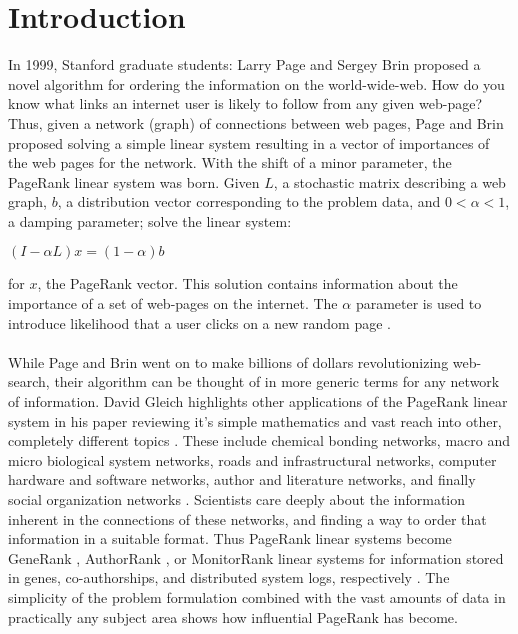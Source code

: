 \documentclass{article}
\begin{document}
\section{Introduction}
In 1999, Stanford graduate students: Larry Page and Sergey Brin proposed a novel algorithm for ordering the information on the world-wide-web. How do you know what links an internet user is likely to follow from any given web-page? Thus, given a network (graph) of connections between web pages, Page and Brin proposed solving a simple linear system resulting in a vector of importances of the web pages for the network. With the shift of a minor parameter, the PageRank linear system was born. Given \textbf{$L$}, a stochastic matrix describing a web graph, \textbf{$b$}, a distribution vector corresponding to the problem data, and $0 < \alpha < 1$, a damping parameter; solve the linear system:\\
\begin{center}
$(I-\alpha L)x = (1-\alpha)b$ \cite{Page:1999} \\
\end{center}
for \textbf{$x$}, the PageRank vector. This solution contains information about the importance of a set of web-pages on the internet. The $\alpha$ parameter is used to introduce likelihood that a user clicks on a new random page \cite{Page:1999}.\\
\\
While Page and Brin went on to make billions of dollars revolutionizing web-search, their algorithm can be thought of in more generic terms for any network of information. David Gleich highlights other applications of the PageRank linear system in his paper reviewing it's simple mathematics and vast reach into other, completely different topics \cite{Gleich:2015}. These include chemical bonding networks, macro and micro biological system networks, roads and infrastructural networks, computer hardware and software networks, author and literature networks, and finally social organization networks \cite{Gleich:2015}. Scientists care deeply about the information inherent in the connections of these networks, and finding a way to order that information in a suitable format. Thus PageRank linear systems become GeneRank \cite{Jiang:2009}, AuthorRank \cite{Liu:2005}, or MonitorRank \cite{Kim:2013} linear systems for information stored in genes, co-authorships, and distributed system logs, respectively \cite{Gleich:2015}. The simplicity of the problem formulation combined with the vast amounts of data in practically any subject area shows how influential PageRank has become.\\
\end{document}
